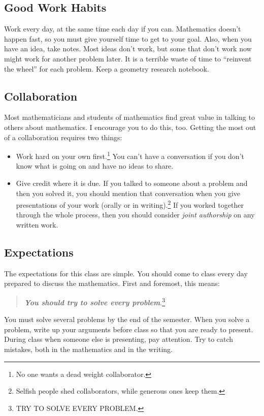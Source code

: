 \subsection*{Good Work Habits}
Work every day, at the same time each day if you can.
Mathematics doesn't happen fast, so you must give yourself time to get to your goal.
Also, when you have an idea, take notes.
Most ideas don't work, but some that don't work now might work for another problem later.
It is a terrible waste of time to ``reinvent the wheel'' for each problem.
Keep a geometry research notebook.

\subsection*{Collaboration}
Most mathematicians and students of mathematics find great value in talking to others about mathematics.
I encourage you to do this, too.
Getting the most out of a collaboration requires two things:
\begin{itemize}
\item Work hard on your own first.\footnote{No one wants a dead weight collaborator.}
You can't have a conversation if you don't know what is going on and have no ideas to share.

\item Give credit where it is due.
If you talked to someone about a problem and then you solved it, you should mention that conversation when you give presentations of your work (orally or in writing).\footnote{Selfish people shed collaborators, while generous ones keep them.}
If you worked together through the whole process, then you should consider \emph{joint authorship} on any written work.

\end{itemize}


\subsection*{Expectations}
The expectations for this class are simple.
You should come to class every day prepared to discuss the mathematics. First and foremost, this means:
\begin{quotation}
\textbf{\emph{You should try to solve every problem}}.\footnote{TRY TO SOLVE EVERY PROBLEM.}
\end{quotation}
You must solve several problems by the end of the semester.
When you solve a problem, write up your arguments before class so that you are ready to present.
During class when someone else is presenting, pay attention.
Try to catch  mistakes, both in the mathematics and in the writing.

